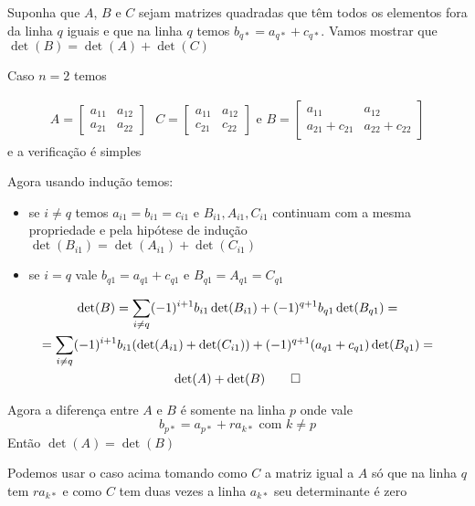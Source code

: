 \documentclass{beamer}
\begin{document}
\begin{frame}
  Suponha que $A$, $B$ e $C$ sejam matrizes quadradas que têm todos os elementos fora da linha $q$ iguais e
  que na linha $q$ temos $b_{q*} = a_{q*} + c_{q*}$. Vamos mostrar que $\det(B) = \det(A) + \det(C)$

Caso $n=2$ temos

\begin{gather*}
  A = \begin{bmatrix}a_{11} & a_{12} \\
  a_{21}& a_{22}\end{bmatrix} \text{ } C= \begin{bmatrix}a_{11} & a_{12} \\
  c_{21}& c_{22}\end{bmatrix} \text{ e }B= \begin{bmatrix}a_{11} & a_{12} \\
  a_{21}+ c_{21}& a_{22}+c_{22}\end{bmatrix}
\end{gather*}
e a verificação é simples
\end{frame}

\begin{frame}
  Agora usando indução temos:
  \begin{itemize}
    \item se $i\neq q$ temos $a_{i1}=b_{i1} =c_{i1}$ e $B_{i1}, A_{i1}, C_{i1}$ continuam com a mesma propriedade e pela hipótese de indução $\det(B_{i1})=\det(A_{i1})+ \det(C_{i1})$
    \item se $i = q$ vale $b_{q1} = a_{q1} + c_{q1}$ e $B_{q1}=A_{q1}=C_{q1}$
  \end{itemize}
  \begin{gather*}
    \det(B) =\sum_{i\neq q} (-1)^{i+1}b_{i1}\det(B_{i1}) + (-1)^{q+1}b_{q1}\det(B_{q1}) = \\
=\sum_{i\neq q} (-1)^{i+1}b_{i1}(\det(A_{i1})+\det(C_{i1})) + (-1)^{q+1}(a_{q1}+ c_{q1})\det(B_{q1}) = \\
\det(A) + \det(B) \qed
  \end{gather*}
\end{frame}

\begin{frame}
  Agora a diferença entre $A$ e $B$ é somente na linha $p$ onde
  vale 
  $$b_{p*} = a_{p*} + ra_{k*} \text{ com } k\neq p$$
  Então $\det(A) = \det(B)$
  
  Podemos usar o caso acima tomando como $C$ a matriz igual a $A$ só que na linha $q$ tem $ra_{k*}$
e como $C$ tem duas vezes a linha $a_{k*}$ seu determinante é zero
  
\end{frame}
\end{document}
